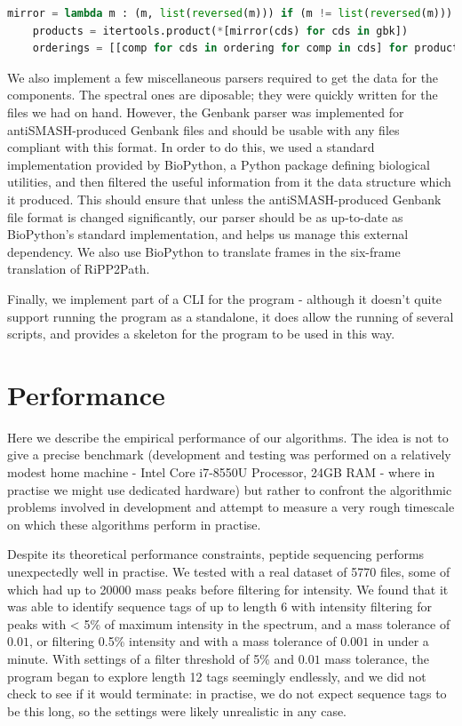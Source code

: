 \documentclass{l4proj}
\begin{document}
\begin{lstlisting}[language=python, float, caption={The three lines of code used to generate all possible assembly-orderings for the alignment comparison.}, label=lst:itertoolscode]
	mirror = lambda m : (m, list(reversed(m))) if (m != list(reversed(m))) else (m,)
	products = itertools.product(*[mirror(cds) for cds in gbk])
	orderings = [[comp for cds in ordering for comp in cds] for product in products for ordering in itertools.permutations(product, len(product))]
\end{lstlisting}

We also implement a few miscellaneous parsers required to get the data for the components. The spectral ones are diposable; they were quickly written for the files we had on hand. However, the Genbank parser was implemented for antiSMASH-produced Genbank files and should be usable with any files compliant with this format. In order to do this, we used a standard implementation provided by BioPython, a Python package defining biological utilities, and then filtered the useful information from it the data structure which it produced. This should ensure that unless the antiSMASH-produced Genbank file format is changed significantly, our parser should be as up-to-date as BioPython's standard implementation, and helps us manage this external dependency. We also use BioPython to translate frames in the six-frame translation of RiPP2Path.

Finally, we implement part of a CLI for the program - although it doesn't quite support running the program as a standalone, it does allow the running of several scripts, and provides a skeleton for the program to be used in this way.

\section{Performance} \label{performance}

Here we describe the empirical performance of our algorithms. The idea is not to give a precise benchmark (development and testing was performed on a relatively modest home machine - Intel Core i7-8550U Processor, 24GB RAM - where in practise we might use dedicated hardware) but rather to confront the algorithmic problems involved in development and attempt to measure a very rough timescale on which these algorithms perform in practise.

Despite its theoretical performance constraints, peptide sequencing performs unexpectedly well in practise. We tested with a real dataset of 5770 files, some of which had up to 20000 mass peaks before filtering for intensity. We found that it was able to identify sequence tags of up to length 6 with intensity filtering for peaks with < 5\% of maximum intensity in the spectrum, and a mass tolerance of \(0.01\), or filtering 0.5\% intensity and with a mass tolerance of \(0.001\) in under a minute. With settings of a filter threshold of 5\% and \(0.01\) mass tolerance, the program began to explore length 12 tags seemingly endlessly, and we did not check to see if it would terminate: in practise, we do not expect sequence tags to be this long, so the settings were likely unrealistic in any case. 
\end{document}

